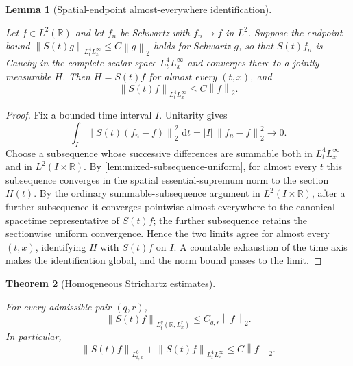 \documentclass[11pt,oneside]{book}
\providecommand{\uses}[1]{}
\newtheorem{theorem}{Theorem}[chapter]
\newtheorem{lemma}[theorem]{Lemma}
\theoremstyle{definition}
\theoremstyle{remark}
\newcommand{\R}{\mathbb R}
\newcommand{\1}{\mathbf 1}
\newcommand{\dd}{\,\mathrm d}
\newcommand{\norm}[1]{\left\lVert #1\right\rVert}
\begin{document}
\begin{lemma}[Spatial-endpoint almost-everywhere identification]\label{lem:strichartz-endpoint-identification}
\uses{def:propagator, def:scalar-mixed-norm}
Let $f\in L^2(\R)$ and let $f_n$ be Schwartz with $f_n\to f$ in $L^2$. Suppose the endpoint bound $\norm{S(t)g}_{L^4_tL^\infty_x}\le C\norm g_2$ holds for Schwartz $g$, so that $S(t)f_n$ is Cauchy in the complete scalar space $L^4_tL^\infty_x$ and converges there to a jointly measurable $H$. Then $H=S(t)f$ for almost every $(t,x)$, and
\[
 \norm{S(t)f}_{L^4_tL^\infty_x}\le C\norm f_2 .
\]
\end{lemma}

\begin{proof}
\uses{lem:mixed-subsequence-uniform}
Fix a bounded time interval $I$. Unitarity gives
\[
 \int_I\norm{S(t)(f_n-f)}_2^2\,\dd t
 =|I|\,\norm{f_n-f}_2^2\longrightarrow0 .
\]
Choose a subsequence whose successive differences are summable both in $L^4_tL^\infty_x$ and in $L^2(I\times\R)$. By \cref{lem:mixed-subsequence-uniform}, for almost every $t$ this subsequence converges in the spatial essential-supremum norm to the section $H(t)$. By the ordinary summable-subsequence argument in $L^2(I\times\R)$, after a further subsequence it converges pointwise almost everywhere to the canonical spacetime representative of $S(t)f$; the further subsequence retains the sectionwise uniform convergence. Hence the two limits agree for almost every $(t,x)$, identifying $H$ with $S(t)f$ on $I$. A countable exhaustion of the time axis makes the identification global, and the norm bound passes to the limit.
\end{proof}

\begin{theorem}[Homogeneous Strichartz estimates]\label{thm:hom-strichartz}
\uses{def:admissible-pairs, def:propagator}
For every admissible pair $(q,r)$,
\[
  \norm{S(t)f}_{L^q_t(\R;L^r_x)}\le C_{q,r}\norm f_2 .
\]
In particular,
\[
 \norm{S(t)f}_{L^6_{t,x}}+\norm{S(t)f}_{L^4_tL^\infty_x}
 \le C\norm f_2 .
\]
\end{theorem}
\end{document}
